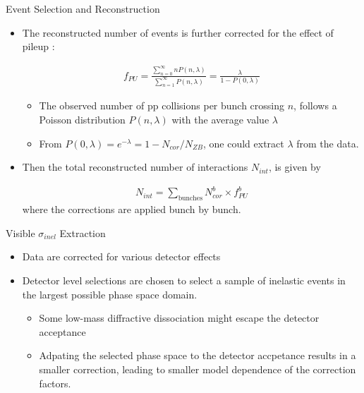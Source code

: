 \documentclass[aspectratio=169,xcolor=dvipsnames]{beamer}
\begin{document}
\begin{frame}{Event Selection and Reconstruction}
	\begin{itemize}
		\item The reconstructed number of events is further corrected for the effect of pileup : 
		
		\begin{align*}
		f_{PU} = \frac{\sum_{n=0}^{\infty}nP(n,\lambda)}{\sum_{n=1}^{\infty}P(n,\lambda)} = \frac{\lambda}{1-P(0,\lambda)}
		\end{align*}
		\begin{itemize}
			\item The observed number of pp collisions per bunch crossing $n$, follows a Poisson distribution $P(n,\lambda)$ with the average value $\lambda$
			\item From $P(0,\lambda) = e^{-\lambda}=1-N_{cor}/N_{ZB}$, one could extract $\lambda$ from the data.
		\end{itemize}\vspace{0.1in}
		\item  Then the total reconstructed number of interactions $N_{int}$, is given by
		
		\begin{align*}
			N_{int} = \sum_{\text{bunches}} N_{cor}^b \times f_{PU}^b
		\end{align*} \vspace{0.1in}
		where the corrections are applied bunch by bunch.
	\end{itemize}
\end{frame}

\begin{frame}{Visible $\sigma_{inel}$ Extraction}
	\begin{itemize}
		\item Data are corrected for various detector effects
		\item Detector level selections are chosen to select a sample of inelastic events in the largest possible phase space domain.
		\begin{itemize}
			\item Some low-mass diffractive dissociation might escape the detector acceptance 
			\item Adpating the selected phase space to the detector accpetance results in a smaller correction, leading to smaller model dependence of the correction factors.
		\end{itemize}
	\end{itemize}
\end{frame}
\end{document}
